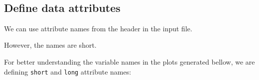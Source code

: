 \documentclass[11pt]{article}
\begin{document}
    \begin{center}
    \end{center}
    { \hspace*{\fill} \\}
    
    \hypertarget{define-data-attributes}{%
\subsection{Define data attributes}\label{define-data-attributes}}

We can use attribute names from the header in the input file.

However, the names are short.

For better understanding the variable names in the plots generated
bellow, we are defining \texttt{short} and \texttt{long} attribute
names:
\end{document}
